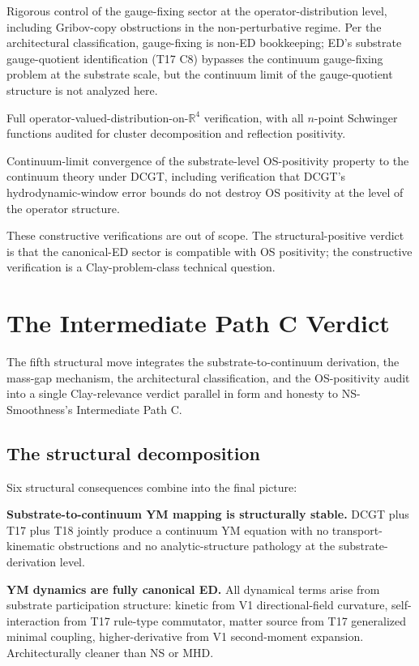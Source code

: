 \documentclass[11pt,a4paper]{article}
\begin{document}
Rigorous control of the gauge-fixing sector at the operator-distribution level, including Gribov-copy obstructions in the non-perturbative regime. Per the architectural classification, gauge-fixing is non-ED bookkeeping; ED's substrate gauge-quotient identification (T17 C8) bypasses the continuum gauge-fixing problem at the substrate scale, but the continuum limit of the gauge-quotient structure is not analyzed here.

Full operator-valued-distribution-on-$\mathbb{R}^{4}$ verification, with all $n$-point Schwinger functions audited for cluster decomposition and reflection positivity.

Continuum-limit convergence of the substrate-level OS-positivity property to the continuum theory under DCGT, including verification that DCGT's hydrodynamic-window error bounds do not destroy OS positivity at the level of the operator structure.

These constructive verifications are out of scope. The structural-positive verdict is that the canonical-ED sector is compatible with OS positivity; the constructive verification is a Clay-problem-class technical question.

\section{The Intermediate Path C Verdict}

The fifth structural move integrates the substrate-to-continuum derivation, the mass-gap mechanism, the architectural classification, and the OS-positivity audit into a single Clay-relevance verdict parallel in form and honesty to NS-Smoothness's Intermediate Path C.

\subsection{The structural decomposition}

Six structural consequences combine into the final picture:

\textbf{Substrate-to-continuum YM mapping is structurally stable.} DCGT plus T17 plus T18 jointly produce a continuum YM equation with no transport-kinematic obstructions and no analytic-structure pathology at the substrate-derivation level.

\textbf{YM dynamics are fully canonical ED.} All dynamical terms arise from substrate participation structure: kinetic from V1 directional-field curvature, self-interaction from T17 rule-type commutator, matter source from T17 generalized minimal coupling, higher-derivative from V1 second-moment expansion. Architecturally cleaner than NS or MHD.
\end{document}
